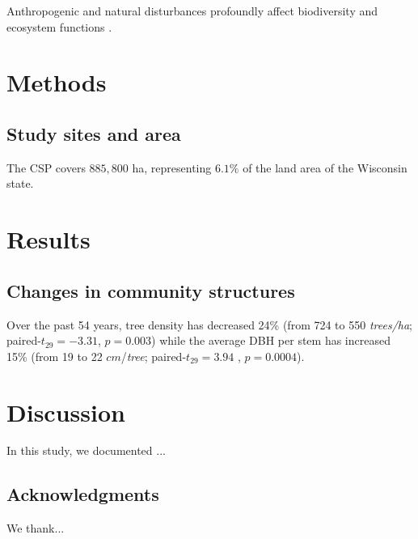 Anthropogenic and natural disturbances profoundly affect biodiversity
and ecosystem functions \citep{naeem2009biodiversity}.

\section*{Methods}

\subsection*{Study sites and area}

The CSP covers $885,800$ ha, representing $6.1\%$ of the land area
of the Wisconsin state.

\section*{Results}
\subsection*{Changes in community structures}

Over the past 54 years, tree density has decreased 24\% (from 724
to 550 \emph{trees/ha}; paired-$t_{29}=-3.31$, $p=0.003$) while
the average DBH per stem has increased 15\% (from 19 to 22 $cm$/\emph{tree};
paired-$t_{29}=3.94$ , $p=0.0004$).

\section*{Discussion}

In this study, we documented ...

\subsection*{Acknowledgments}

We thank...

\clearpage{}
\begin{onehalfspace}


\end{onehalfspace}


\renewcommand{\tablename}{Table}
\renewcommand{\thetable}{\arabic{table}}
\renewcommand{\figurename}{Figure}
\renewcommand{\thefigure}{\arabic{figure}}
\setcounter{figure}{0}
\setcounter{table}{0}


